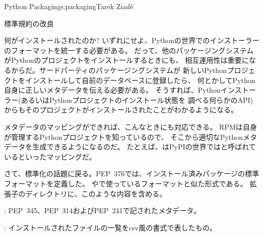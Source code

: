 \begin{aosachapter}{Python Packaging}{s:packaging}{Tarek Ziad\'{e}}
\begin{aosasect1}{標準規約の改良}
\begin{aosasect2}{何がインストールされたのか?}
いずれにせよ、Pythonの世界でのインストーラーのフォーマットを統一する必要がある。
だって、他のパッケージングシステムがPythonのプロジェクトをインストールするときにも、
相互運用性は重要になるからだ。サードパーティのパッケージングシステムが
新しいPythonプロジェクトをインストールして自前のデータベースに登録したら、
何とかしてPython自身に正しいメタデータを伝える必要がある。
そうすれば、Pythonインストーラー(あるいはPythonプロジェクトのインストール状態を
調べる何らかのAPI)からもそのプロジェクトがインストールされたことがわかるようになる。

メタデータのマッピングができれば、こんなときにも対応できる。
RPMは自身が管理するPythonプロジェクトを知っているので、
そこから適切なPythonメタデータを生成できるようになるのだ。
たとえば、はPyPIの世界ではと呼ばれているといったマッピングだ。

さて、標準化の話題に戻る。PEP~376では、インストール済みパッケージの標準フォーマットを定義した。
やで使っているフォーマットと似た形式である。
拡張子のディレクトリに、このような内容を含める。

\begin{aosaitemize}

  \item {}: PEP~345、PEP~314およびPEP~241で記されたメタデータ。

  \item {}: インストールされたファイルの一覧をcsv風の書式で表したもの。


\end{aosaitemize}
\end{aosasect2}
\end{aosasect1}
\end{aosachapter}
